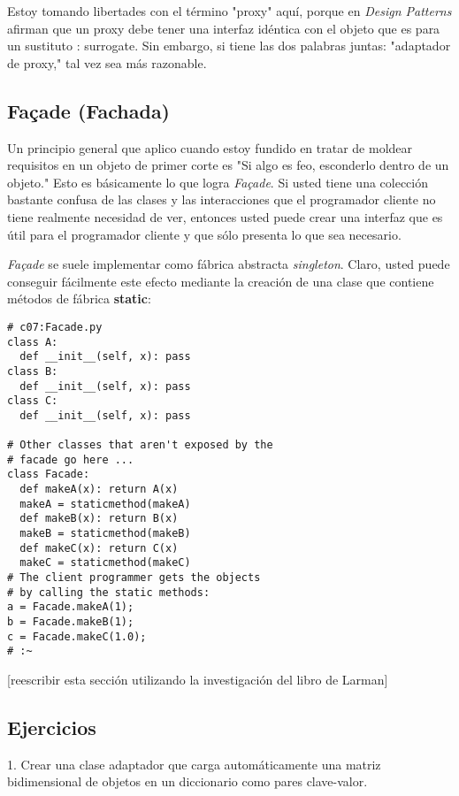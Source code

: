 Estoy tomando libertades con el término "proxy" aquí, porque en \textit{Design Patterns} afirman que un proxy debe tener una interfaz idéntica con el objeto que es para un sustituto : surrogate. Sin embargo, si tiene las dos palabras juntas: "adaptador de proxy," tal vez sea más razonable.  \newline

\subsection*{Façade (Fachada)}
\label{subsec:Fachada}

Un principio general que aplico cuando estoy fundido en tratar de moldear requisitos en un objeto de primer corte es "Si algo es feo, esconderlo dentro de un objeto." Esto es básicamente lo que logra \textit{Façade}. Si usted tiene una colección bastante confusa de las clases y las interacciones que el programador cliente no tiene realmente necesidad de ver, entonces usted puede crear una interfaz que es útil para el programador cliente y que sólo presenta lo que sea necesario.

\textit{Façade} se suele implementar como fábrica abstracta \textit{singleton}. Claro, usted puede conseguir fácilmente este efecto mediante la creación de una clase que contiene métodos de fábrica \textbf{static}:  \newline

\begin{lstlisting} 
# c07:Facade.py 
class A: 
  def __init__(self, x): pass 
class B: 
  def __init__(self, x): pass 
class C: 
  def __init__(self, x): pass 
  
# Other classes that aren't exposed by the 
# facade go here ... 
class Facade: 
  def makeA(x): return A(x) 
  makeA = staticmethod(makeA) 
  def makeB(x): return B(x) 
  makeB = staticmethod(makeB) 
  def makeC(x): return C(x) 
  makeC = staticmethod(makeC) 
# The client programmer gets the objects 
# by calling the static methods: 
a = Facade.makeA(1); 
b = Facade.makeB(1); 
c = Facade.makeC(1.0); 
# :~ 
\end{lstlisting}
[reescribir esta sección utilizando la investigación del libro de Larman]   \newline

\subsection*{Ejercicios}
\label{subsec:Ejercicios10}


1. Crear una clase adaptador que carga automáticamente una matriz bidimensional de objetos en un diccionario como pares clave-valor.

\newpage